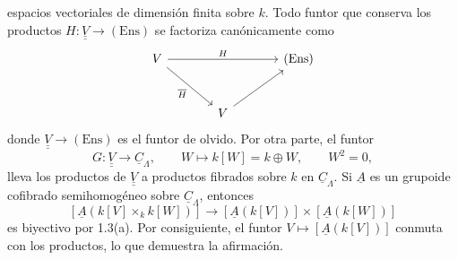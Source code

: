 
espacios vectoriales de dimensión finita sobre $k$. Todo funtor que
conserva los productos
$H:\underline{\underline V}\longrightarrow(\mathrm{Ens})$ se factoriza
canónicamente como
\[
\begin{tikzcd}[row sep=large,column sep=large]
\underline{\underline V} \arrow[rr,"H"]
 \arrow[dr,"\overline H"'] & & (\mathrm{Ens}) \\
& \underline{\underline V} \arrow[ur] &
\end{tikzcd}
\]
donde $\underline{\underline V}\longrightarrow(\mathrm{Ens})$ es el
funtor de olvido. Por otra parte, el funtor
\[
 G:\underline{\underline V}\longrightarrow\underline C_\Lambda,
 \qquad W\longmapsto k[W]=k\oplus W,\qquad W^2=0,
\]
lleva los productos de $\underline{\underline V}$ a productos fibrados
sobre $k$ en $\underline C_\Lambda$. Si $\underline A$ es un grupoide
cofibrado semihomogéneo sobre $\underline C_\Lambda$, entonces
\[
 [\underline A(k[V]\times_k k[W])]
 \longrightarrow
 [\underline A(k[V])]\times[\underline A(k[W])]
\]
es biyectivo por 1.3(a). Por consiguiente, el funtor
$V\longmapsto[\underline A(k[V])]$ conmuta con los productos, lo que
demuestra la afirmación.
